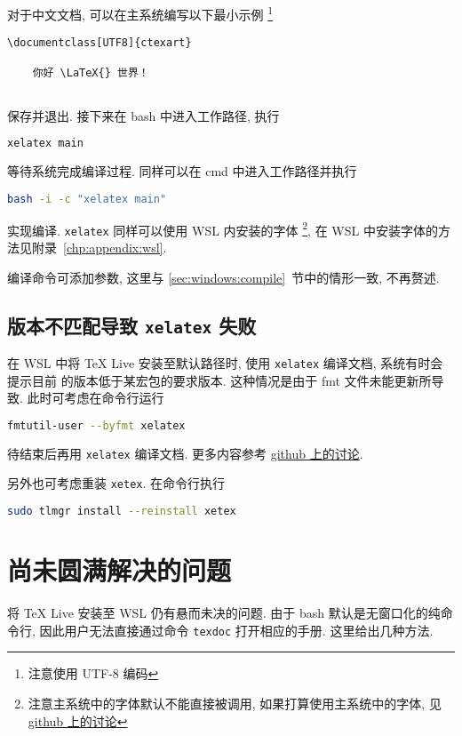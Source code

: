 对于中文文档, 可以在主系统编写以下最小示例%
\footnote{注意使用 UTF-8 编码}%
\begin{lstlisting}[language={[LaTeX]TeX}]
  \documentclass[UTF8]{ctexart}
  
    你好 \LaTeX{} 世界！
  
\end{lstlisting}
保存并退出.
接下来在 \textsf{bash} 中进入工作路径,
执行
\begin{lstlisting}[language=bash]
  xelatex main
\end{lstlisting}
等待系统完成编译过程.
同样可以在 \textsf{cmd} 中进入工作路径并执行
\begin{lstlisting}[language=bash]
  bash -i -c "xelatex main"
\end{lstlisting}
实现编译.
\texttt{xelatex} 同样可以使用 WSL 内安装的字体%
\footnote{注意主系统中的字体默认不能直接被调用,
如果打算使用主系统中的字体,
见
\href{https://github.com/OsbertWang/install-latex/issues/14}{github 上的讨论}},
在 WSL 中安装字体的方法见附录~\ref{chp:appendix:wsl}.

编译命令可添加参数, 这里与 \ref{sec:windows:compile}~节中的情形一致, 不再赘述.

\subsection{\LaTeXe 版本不匹配导致 \texttt{xelatex} 失败}

在 WSL 中将 \TeX{} Live 安装至默认路径时,
使用 \texttt{xelatex} 编译文档,
系统有时会提示目前 \LaTeXe 的版本低于某宏包的要求版本.
这种情况是由于 \textsf{fmt} 文件未能更新所导致.
此时可考虑在命令行运行
\begin{lstlisting}[language=bash]
  fmtutil-user --byfmt xelatex
\end{lstlisting}
待结束后再用 \texttt{xelatex} 编译文档.
更多内容参考
\href{https://github.com/CTeX-org/forum/issues/70}{github 上的讨论}.

另外也可考虑重装 \texttt{xetex}.
在命令行执行
\begin{lstlisting}[language=bash]
  sudo tlmgr install --reinstall xetex
\end{lstlisting}

\section{尚未圆满解决的问题}

将 \TeX{} Live 安装至 WSL 仍有悬而未决的问题.
由于 \textsf{bash} 默认是无窗口化的纯命令行,
因此用户无法直接通过命令 \texttt{texdoc} 打开相应的手册.
这里给出几种方法.

